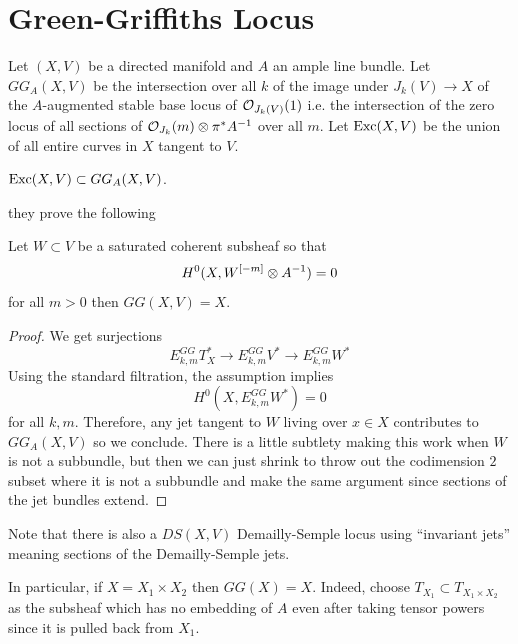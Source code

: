 \documentclass[main.tex]{subfiles}
\begin{document}
\section{Green-Griffiths Locus}

Let $(X,V)$ be a directed manifold and $A$ an ample line bundle. Let $GG_A(X,V)$ be the intersection over all $k$ of the image under $J_k(V) \to X$ of the $A$-augmented stable base locus of $\mathcal{O}_{J_k(V)}(1)$ i.e. the intersection of the zero locus of all sections of $\mathcal{O}_{J_k}(m) \otimes \pi^* A^{-1}$ over all $m$.  Let $\operatorname{\mathrm{Exc}}(X,V)$ be the union of all entire curves in $X$ tangent to $V$.

\begin{theorem}
$\operatorname{\mathrm{Exc}}(X,V) \subset GG_A(X,V)$.
\end{theorem}

 they prove the following

\begin{theorem}
Let $W \subset V$ be a saturated coherent subsheaf so that
\[ H^0(X, W^{[-m]} \otimes A^{-1}) = 0 \]
for all $m > 0$ then $GG(X,V) = X$.
\end{theorem}

\begin{proof}
We get surjections
\[ E^{GG}_{k,m} T_X^* \to E^{GG}_{k,m} V^* \to E_{k,m}^{GG} W^* \]
Using the standard filtration, the assumption implies
\[ H^0(X, E_{k,m}^{GG} W^*) = 0 \]
for all $k, m$. Therefore, any jet tangent to $W$ living over $x \in X$ contributes to $GG_A(X,V)$ so we conclude. There is a little subtlety making this work when $W$ is not a subbundle, but then we can just shrink to throw out the codimension $2$ subset where it is not a subbundle and make the same argument since sections of the jet bundles extend.
\end{proof}

\begin{rmk}
Note that there is also a $DS(X,V)$ Demailly-Semple locus using ``invariant jets'' meaning sections of the Demailly-Semple jets.
\end{rmk}

\begin{example}
In particular, if $X = X_1 \times X_2$ then $GG(X) = X$. Indeed, choose $T_{X_1} \subset T_{X_1 \times X_2}$ as the subsheaf which has no embedding of $A$ even after taking tensor powers since it is pulled back from $X_1$.
\end{example}
\end{document}
